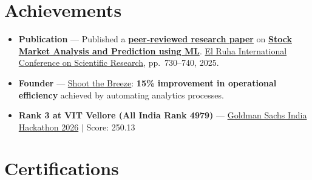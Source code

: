 \documentclass[a4paper,10pt]{article}
\newcommand{\ulink}[2]{\href{#1}{#2}}
\begin{document}
\section{Achievements}
\vspace{2pt}

\begin{itemize}[nosep, leftmargin=1.5em, itemsep=2pt, topsep=2pt]
  \item {\color[HTML]{0A0A0A}\fontsize{11}{14}\selectfont \textbf{Publication} --- Published a \ulink{https://www.elruha.org/_files/ugd/614b1f_6b95e1b697bf452b9907ba46e0151c05.pdf\#page=774}{\textbf{peer-reviewed research paper}} on \ulink{https://github.com/su-jin1425/Set-Project}{\textbf{Stock Market Analysis and Prediction using ML}}. \ulink{https://www.elruha.org/congress-books}{El Ruha International Conference on Scientific Research}, pp.\ 730--740, 2025.}
  \item {\color[HTML]{0A0A0A}\fontsize{11}{14}\selectfont \textbf{Founder} --- \ulink{https://shoot-the-breeze.vercel.app}{Shoot the Breeze}: \textbf{15\% improvement in operational efficiency} achieved by automating analytics processes.}
  \item {\color[HTML]{0A0A0A}\fontsize{11}{14}\selectfont \textbf{Rank 3 at VIT Vellore (All India Rank 4979)} --- \ulink{https://www.hackerrank.com/contests/goldman-sachs-india-hackathon-2026-cs/leaderboard}{Goldman Sachs India Hackathon 2026} $|$ Score: 250.13}
\end{itemize}

\section{Certifications}
\vspace{2pt}
\end{document}
